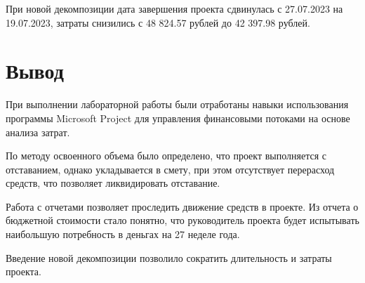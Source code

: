 При новой декомпозиции дата завершения проекта сдвинулась с 27.07.2023 на 19.07.2023, затраты снизились с 48 824.57 рублей до 42 397.98 рублей.

\section*{Вывод}

При выполнении лабораторной работы были отработаны навыки использования программы Microsoft Project для управления финансовыми потоками на основе анализа затрат.

По методу освоенного объема было определено, что проект выполняется с отставанием, однако укладывается в смету, при этом отсутствует перерасход средств, что позволяет ликвидировать отставание.

Работа с отчетами позволяет проследить движение средств в проекте. Из отчета о бюджетной стоимости стало понятно, что руководитель проекта будет испытывать наибольшую потребность в деньгах на 27 неделе года.

Введение новой декомпозиции позволило сократить длительность и затраты проекта.
